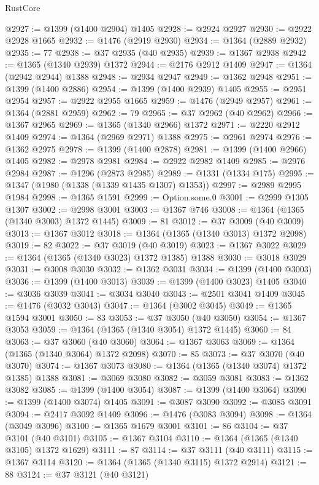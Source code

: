\begin{lexlean}{RustCore}
\begin{coremodule}
@2927 := @1399 (@1400 @2904) @1405
@2928 := @2924 @2927
@2930 := @2922 @2928 @1665
@2932 := @1476 (@2919 @2930)
@2934 := @1364 (@2889 @2932)
@2935 := 77
@2938 := @37 @2935 (@40 @2935)
@2939 := @1367 @2938
@2942 := @1365 (@1340 @2939) @1372
@2944 := @2176 @2912 @1409
@2947 := @1364 (@2942 @2944) @1388
@2948 := @2934 @2947
@2949 := @1362 @2948
@2951 := @1399 (@1400 @2886)
@2954 := @1399 (@1400 @2939) @1405
@2955 := @2951 @2954
@2957 := @2922 @2955 @1665
@2959 := @1476 (@2949 @2957)
@2961 := @1364 (@2881 @2959)
@2962 := 79
@2965 := @37 @2962 (@40 @2962)
@2966 := @1367 @2965
@2969 := @1365 (@1340 @2966) @1372
@2971 := @2220 @2912 @1409
@2974 := @1364 (@2969 @2971) @1388
@2975 := @2961 @2974
@2976 := @1362 @2975
@2978 := @1399 (@1400 @2878)
@2981 := @1399 (@1400 @2966) @1405
@2982 := @2978 @2981
@2984 := @2922 @2982 @1409
@2985 := @2976 @2984
@2987 := @1296 (@2873 @2985)
@2989 := @1331 (@1334 @175)
@2995 := @1347 (@1980 (@1338 (@1339 @1435 @1307) @1353))
@2997 := @2989 @2995 @1984
@2998 := @1365 @1591
@2999 := Option.some.{0}
@3001 := @2999 @1305 @1307
@3002 := @2998 @3001
@3003 := @1367 @746
@3008 := @1364 (@1365 (@1340 @3003) @1372 @1445)
@3009 := 81
@3012 := @37 @3009 (@40 @3009)
@3013 := @1367 @3012
@3018 := @1364 (@1365 (@1340 @3013) @1372 @2098)
@3019 := 82
@3022 := @37 @3019 (@40 @3019)
@3023 := @1367 @3022
@3029 := @1364 (@1365 (@1340 @3023) @1372 @1385) @1388
@3030 := @3018 @3029
@3031 := @3008 @3030
@3032 := @1362 @3031
@3034 := @1399 (@1400 @3003)
@3036 := @1399 (@1400 @3013)
@3039 := @1399 (@1400 @3023) @1405
@3040 := @3036 @3039
@3041 := @3034 @3040
@3043 := @2501 @3041 @1409
@3045 := @1476 (@3032 @3043)
@3047 := @1364 (@3002 @3045)
@3049 := @1365 @1594 @3001
@3050 := 83
@3053 := @37 @3050 (@40 @3050)
@3054 := @1367 @3053
@3059 := @1364 (@1365 (@1340 @3054) @1372 @1445)
@3060 := 84
@3063 := @37 @3060 (@40 @3060)
@3064 := @1367 @3063
@3069 := @1364 (@1365 (@1340 @3064) @1372 @2098)
@3070 := 85
@3073 := @37 @3070 (@40 @3070)
@3074 := @1367 @3073
@3080 := @1364 (@1365 (@1340 @3074) @1372 @1385) @1388
@3081 := @3069 @3080
@3082 := @3059 @3081
@3083 := @1362 @3082
@3085 := @1399 (@1400 @3054)
@3087 := @1399 (@1400 @3064)
@3090 := @1399 (@1400 @3074) @1405
@3091 := @3087 @3090
@3092 := @3085 @3091
@3094 := @2417 @3092 @1409
@3096 := @1476 (@3083 @3094)
@3098 := @1364 (@3049 @3096)
@3100 := @1365 @1679 @3001
@3101 := 86
@3104 := @37 @3101 (@40 @3101)
@3105 := @1367 @3104
@3110 := @1364 (@1365 (@1340 @3105) @1372 @1629)
@3111 := 87
@3114 := @37 @3111 (@40 @3111)
@3115 := @1367 @3114
@3120 := @1364 (@1365 (@1340 @3115) @1372 @2914)
@3121 := 88
@3124 := @37 @3121 (@40 @3121)

\end{coremodule}
\end{lexlean}
